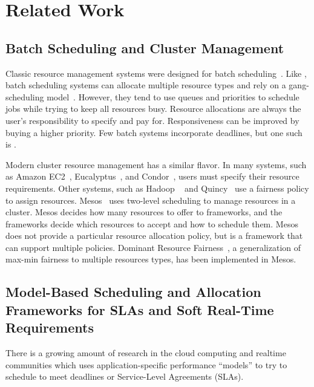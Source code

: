 \section{Related Work}\label{related_work}
\subsection{Batch Scheduling and Cluster Management}
Classic resource management systems were designed for batch scheduling~\cite{Feit97,FRS04}. Like \pacora, batch scheduling systems can allocate multiple resource types and rely on a gang-scheduling model~\cite{FeRu92}.  However, they tend to use queues and priorities to schedule jobs while trying to keep all resources busy. Resource allocations are always the user's responsibility to specify and pay for. Responsiveness can be improved by buying a higher priority. Few batch systems incorporate deadlines, but one such is \cite{AKKMS95}.

Modern cluster resource management has a similar flavor.  In many systems, such as 
Amazon EC2~\cite{EC2}, Eucalyptus~\cite{eucalyptus}, and Condor~\cite{Condor}, users must specify their resource requirements.  Other systems, such as Hadoop ~\cite{hadoop_fair, hadoop_cap, hadoop_matei} and Quincy~\cite{Quincy} use a fairness policy to assign resources. Mesos~\cite{mesos} uses two-level scheduling to manage resources in a cluster. Mesos decides how many resources to offer to frameworks, and the frameworks decide which resources to accept and how to schedule them. Mesos does not provide a particular resource allocation policy, but is a framework that can support multiple policies. Dominant Resource Fairness~\cite{mesos-DRF}, a generalization of max-min fairness to multiple resources types, has been implemented in Mesos.

\subsection{Model-Based Scheduling and Allocation Frameworks for SLAs and Soft Real-Time Requirements}

There is a growing amount of research in the cloud computing and realtime communities which uses application-specific performance ``models'' to try to schedule to meet deadlines or Service-Level Agreements (SLAs).

